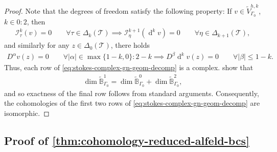 \documentclass{mcom-l}
\theoremstyle{definition}
\theoremstyle{remark}
\numberwithin{equation}{section}
\DeclareMathOperator{\dee}{d}
\newcommand{\mesh}[0]{\mathcal{T}}
\begin{document}
\begin{proof}
	Note that the degrees of freedom satisfy the following property:
	If $v \in \tilde{V}_{\Gamma_0}^{h, k}$, $k \in 0:2$, then 
	\begin{align*}
		\mathcal{I}^{k}_{\tau}(v) = 0 \qquad \forall \tau \in \Delta_{k}(\mesh)
		\implies \mathcal{I}^{k+1}_{\eta}(\dee^k v) = 0 
		\qquad \forall \eta \in \Delta_{k+1}(\mesh),
	\end{align*}
	and similarly for any $z \in \Delta_0(\mesh)$, there holds 
	\begin{align*}
		D^{\alpha} v(z) = 0 \qquad \forall |\alpha| \in \max\{1-k, 0\}:2-k
		\implies D^{\beta} \dee^k v(z) = 0 \qquad \forall |\beta| \leq 1-k. 
	\end{align*}
	Thus, each row of \cref{eq:stokes-complex-gn-geom-decomp} is a complex.
	 show that 
	\begin{align*}
		\dim \tilde{\mathbb{B}}^{1}_{\Gamma_0} = \dim \tilde{\mathbb{B}}^{0}_{\Gamma_0}
		+ \dim \tilde{\mathbb{B}}^{2}_{\Gamma_0},
	\end{align*}
	and so exactness of the final row follows from standard arguments. 
	Consequently, the cohomologies of the first two rows of 
	\cref{eq:stokes-complex-gn-geom-decomp}
	are isomorphic.
\end{proof}

\subsection{Proof of \cref{thm:cohomology-reduced-alfeld-bcs}}
\label{sec:proof-cohomology-reduced-alfeld-bcs}
\end{document}

